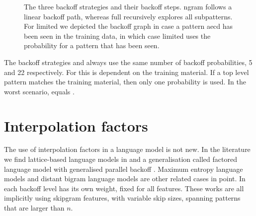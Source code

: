 \begin{figure*}%
    \centering
    \qquad
    \qquad
    \caption{The three backoff strategies and their backoff steps. {\sf ngram} follows a linear backoff path, whereas {\sf full} recursively explores all subpatterns. For {\sf limited} we depicted the backoff graph in case a pattern aecd has been seen in the training data, in which case {\sf limited} uses the probability for a pattern that has been seen. }%
    \label{fig:example}%
\end{figure*}

The backoff strategies \BON and \BOF always use the same number of backoff probabilities, 5 and 22 respectively. For \BOL this is dependent on the training material. If a top level pattern matches the training material, then only one probability is used. In the worst scenario, \BOL equals \BOF.

\section{Interpolation factors}

The use of interpolation factors in a language model is not new. In the literature we find lattice-based language models in
\cite{dupont1997lattice} and a generalisation called factored language model with generalised parallel backoff \cite{bilmes2003factored}. 
  Maximum entropy language models \cite{ROSENFELD1996187} and distant bigram language models \cite{bassiou2011long} are other related cases in point. In \cite{gao2004long} each backoff level has its own weight, fixed for all features. These works are all implicitly using skipgram features, with variable skip sizes, spanning patterns that are larger than $n$. 
  


